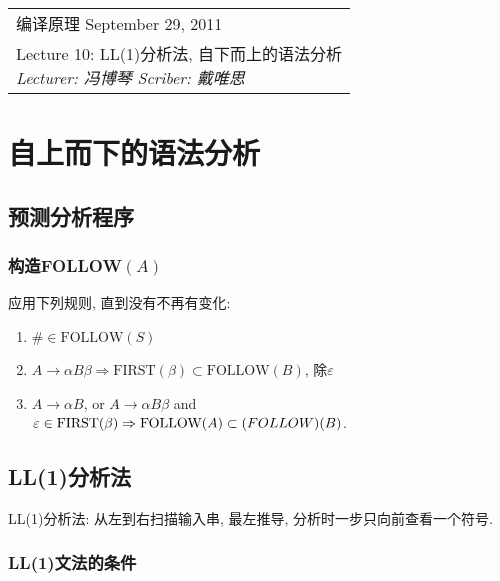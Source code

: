 \def\lecture{10}
\clearpage \noindent\begin{tabularx}{\linewidth}{|X|}
\hline \vskip -2mm
{\sf 编译原理} \hfill September 29, 2011 \\
{\centering \sf \large Lecture \lecture:
LL(1)分析法, 自下而上的语法分析 \\ }
\textsl{Lecturer: 冯博琴 \hfill Scriber: 戴唯思}\\ \hline
\end{tabularx}
\setcounter{section}{0}
\renewcommand{\thepage}{\lecture -\arabic{page}}

\section{自上而下的语法分析}

    \subsection{预测分析程序}

        \subsubsection{构造FOLLOW$(A)$}

            应用下列规则, 直到没有不再有变化:

            \begin{enumerate}
                \item $\#\in\textrm{FOLLOW}(S)$
                \item $A\to\alpha B\beta \Rightarrow \textrm{FIRST}(\beta)\subset\textrm{FOLLOW}(B)$, 除$\varepsilon$
                \item $A\to\alpha B$, or $A\to\alpha B\beta$ and $\varepsilon\in\textrm{FIRST}(\beta)\Rightarrow\textrm{FOLLOW}(A)\subset\textrm(FOLLOW)(B)$.
            \end{enumerate}

    \subsection{LL(1)分析法}

        \textsf{LL(1)分析法}: 从左到右扫描输入串, 最左推导, 分析时一步只向前查看一个符号.

        \subsubsection{LL(1)文法的条件}

